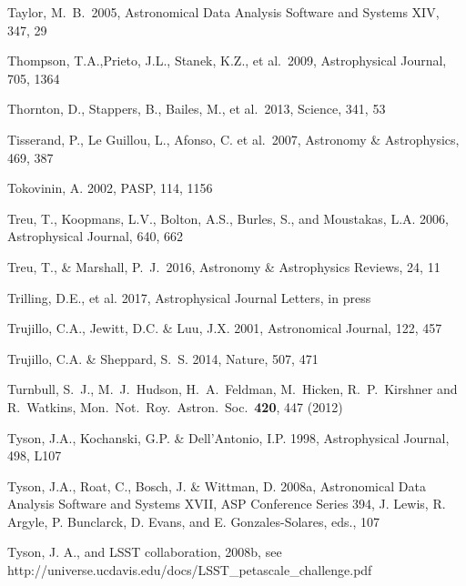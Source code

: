 \documentclass[twocolumn]{aastex61}
\begin{document}
\begin{thebibliography}{}
 Taylor, M.~B.\ 2005, Astronomical Data Analysis Software and Systems XIV, 347, 29

 Thompson, T.A.,Prieto, J.L., Stanek, K.Z., et al.~2009, Astrophysical Journal, 705, 1364

 Thornton, D., Stappers, B., Bailes, M., et al.~2013, Science, 341, 53

 Tisserand, P., Le Guillou, L., Afonso, C. et al.~2007, Astronomy \& Astrophysics, 469, 387

 Tokovinin, A. 2002, PASP, 114, 1156

 Treu, T., Koopmans, L.V., Bolton, A.S., Burles, S., and  Moustakas, L.A. 2006, Astrophysical Journal, 640, 662

 Treu, T., \& Marshall, P.~J.\ 2016, Astronomy \& Astrophysics Reviews, 24, 11

 Trilling, D.E., et al.  2017, Astrophysical Journal Letters, in press

 Trujillo, C.A., Jewitt, D.C. \& Luu, J.X. 2001, Astronomical Journal, 122, 457

 Trujillo, C.A. \& Sheppard, S.~S. 2014, Nature, 507, 471

 Turnbull, S.~J., M.~J.~Hudson, H.~A.~Feldman, M.~Hicken, R.~P.~Kirshner and R.~Watkins, Mon.\ Not.\ Roy.\ Astron.\ Soc.\  {\bf 420}, 447 (2012)

 Tyson, J.A., Kochanski, G.P. \& Dell'Antonio, I.P. 1998, Astrophysical Journal, 498, L107

 Tyson, J.A., Roat, C., Bosch, J. \& Wittman, D. 2008a, Astronomical Data Analysis Software and Systems XVII, ASP Conference Series 394, J. Lewis, R. Argyle, P. Bunclarck, D. Evans, and E. Gonzales-Solares, eds., 107

 Tyson, J. A., and LSST collaboration, 2008b, see http://universe.ucdavis.edu/docs/LSST\_petascale\_challenge.pdf


\end{thebibliography}
\end{document}
